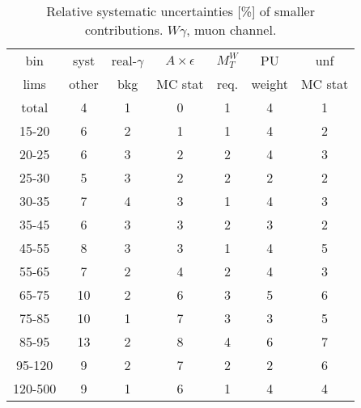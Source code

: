 \begin{table}[h]
  \scriptsize
  \begin{center}
  \caption{Relative systematic uncertainties [\%] of smaller contributions. $W\gamma$, muon channel.}
  \begin{tabular}{|c|c|c|c|c|c|c|}
    bin  & syst & real-$\gamma$ & $A\times\epsilon$ & $M_T^W$ & PU & unf\\
    lims  & other & bkg & MC stat & req. & weight & MC stat\\ \hline
    total  & 4 & 1 & 0 & 1 & 4 & 1 \\ \hline
    15-20 & 6 & 2 & 1 & 1 & 4 & 2 \\ \hline
    20-25 & 6 & 3 & 2 & 2 & 4 & 3 \\ \hline
    25-30 & 5 & 3 & 2 & 2 & 2 & 2 \\ \hline
    30-35 & 7 & 4 & 3 & 1 & 4 & 3 \\ \hline
    35-45 & 6 & 3 & 3 & 2 & 3 & 2 \\ \hline
    45-55 & 8 & 3 & 3 & 1 & 4 & 5 \\ \hline
    55-65 & 7 & 2 & 4 & 2 & 4 & 3 \\ \hline
    65-75 & 10 & 2 & 6 & 3 & 5 & 6 \\ \hline
    75-85 & 10 & 1 & 7 & 3 & 3 & 5 \\ \hline
    85-95 & 13 & 2 & 8 & 4 & 6 & 7 \\ \hline
    95-120 & 9 & 2 & 7 & 2 & 2 & 6 \\ \hline
    120-500 & 9 & 1 & 6 & 1 & 4 & 4 \\ \hline
  \end{tabular}
  \label{tab:systInPercentSmallSysts_MUON_WGamma}
  \end{center}
\end{table}

